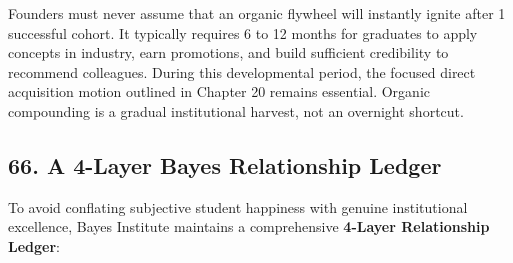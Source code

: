 Founders must never assume that an organic flywheel will instantly ignite after 1 successful cohort. It typically requires 6 to 12 months for graduates to apply concepts in industry, earn promotions, and build sufficient credibility to recommend colleagues. During this developmental period, the focused direct acquisition motion outlined in Chapter 20 remains essential. Organic compounding is a gradual institutional harvest, not an overnight shortcut.

\subsection*{66. A 4-Layer Bayes Relationship Ledger}

To avoid conflating subjective student happiness with genuine institutional excellence, Bayes Institute maintains a comprehensive \textbf{4-Layer Relationship Ledger}:

